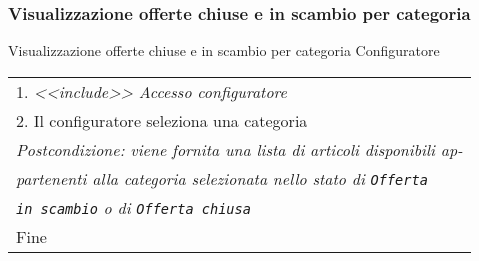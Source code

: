\begin{minipage}{\textwidth}
    \subsubsection{Visualizzazione offerte chiuse e in scambio per categoria}
    \usecase
        {Visualizzazione offerte chiuse e in scambio per categoria}
        {
            Configuratore %
        }
        {
            \begin{tabular}{l}
                1. \textit{<<include>> Accesso configuratore}\\
                2. Il configuratore seleziona una categoria\\
                \textit{Postcondizione: viene fornita una lista di articoli disponibili ap-}\\
                \textit{partenenti alla categoria selezionata nello stato di \texttt{Offerta}}\\
                \textit{\texttt{in scambio} o di \texttt{Offerta chiusa}}\\
                Fine
            \end{tabular}\\

            \\


        }
        \vspace{0.5cm}
\end{minipage}